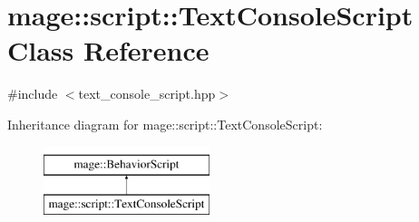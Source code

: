 \hypertarget{classmage_1_1script_1_1_text_console_script}{}\section{mage\+:\+:script\+:\+:Text\+Console\+Script Class Reference}
\label{classmage_1_1script_1_1_text_console_script}


{\ttfamily \#include $<$text\+\_\+console\+\_\+script.\+hpp$>$}

Inheritance diagram for mage\+:\+:script\+:\+:Text\+Console\+Script\+:\begin{figure}[H]
\begin{center}
\leavevmode
\includegraphics[height=2.000000cm]{classmage_1_1script_1_1_text_console_script}
\end{center}
\end{figure}
